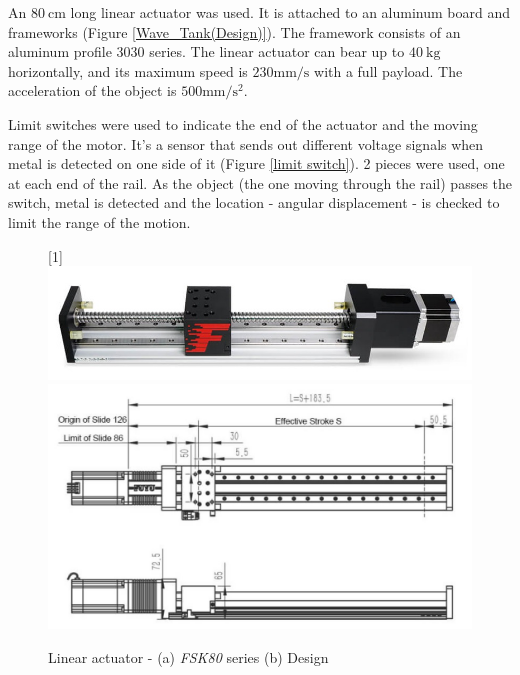An $80\mathrm{~cm}$ long linear actuator was used. It is attached to an aluminum board and frameworks (Figure \ref{Wave_Tank(Design)}). The framework consists of an aluminum profile 3030 series. The linear actuator can bear up to $40\mathrm{~kg}$ horizontally, and its maximum speed is $230\mathrm{mm/s}$ with a full payload. The acceleration of the object is $500\mathrm{mm/s^{2}}$.

Limit switches were used to indicate the end of the actuator and the moving range of the motor. It's a sensor that sends out different voltage signals when metal is detected on one side of it (Figure \ref{limit switch}). 2 pieces were used, one at each end of the rail. As the object (the one moving through the rail) passes the switch, metal is detected and the location - angular displacement - is checked to limit the range of the motion.

\begin{figure}[H]
    \begin{center}
        \scalebox{-1}[1]{\includegraphics[width = 12cm]{images/Linear_Actuator.jpg}}
        \includegraphics[width = 12cm]{images/Linear_Actuator(Design).jpg}
    \end{center}
        \caption{Linear actuator - (a) \textit{FSK80} series (b) Design}
        \label{linear actuator}
\end{figure}

